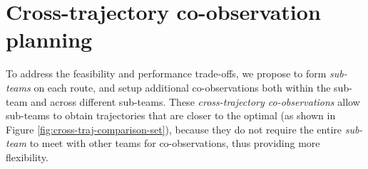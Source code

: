 \documentclass[10pt,twocolumn,twoside]{IEEEtran}
\begin{document}

\section{Cross-trajectory co-observation planning}\label{sec:cross-trajectory}
To address the feasibility and performance trade-offs, we propose to form \emph{sub-teams} on each route, and setup additional co-observations both within the sub-team and across different sub-teams. These \emph{cross-trajectory co-observations} allow sub-teams to obtain trajectories that are closer to the optimal (as shown in Figure \ref{fig:cross-traj-comparison-set}), because they do not require the entire \emph{sub-team} to meet with other teams for co-observations, thus providing more flexibility.
\end{document}

